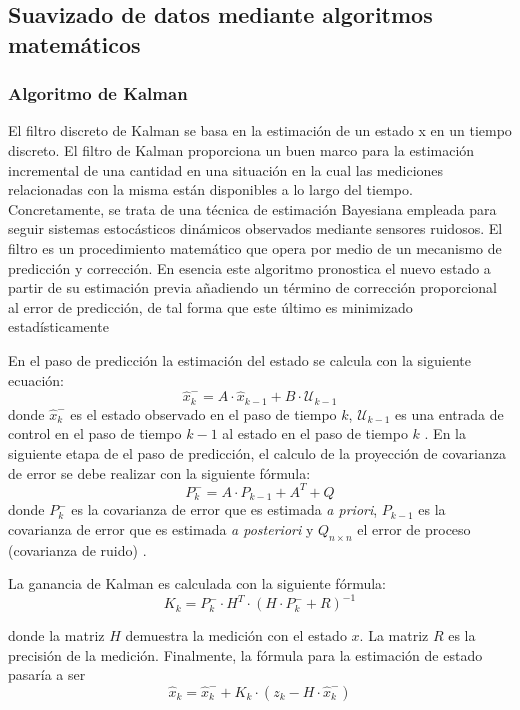 \documentclass[10pt,a4paper]{article}
\begin{document}
\subsection{Suavizado de datos mediante algoritmos matemáticos}

\subsubsection{Algoritmo de Kalman}
El filtro discreto de Kalman se basa en la estimación de un estado x en un tiempo discreto. El filtro de Kalman proporciona un buen marco para la estimación incremental de una cantidad en una situación en la cual las mediciones relacionadas con la misma están disponibles a lo largo del tiempo. Concretamente, se trata de una técnica de estimación Bayesiana empleada para seguir sistemas estocásticos dinámicos observados mediante sensores ruidosos. El filtro es un procedimiento matemático que opera por medio de un mecanismo de predicción y corrección.  En esencia este algoritmo pronostica el nuevo estado a partir de su estimación previa añadiendo un término de corrección proporcional al error de predicción, de tal forma que este último es minimizado estadísticamente

En el paso de predicción la estimación del estado se calcula con la siguiente ecuación: 
\begin{equation}
\hat{x}^{-}_{k} = A \cdot \hat{x}_{k-1} + B \cdot \mathcal{U}_{k-1}
\end{equation}
donde $\hat{x}^{-}_{k}$ es el estado observado en el paso de tiempo $k$, $\mathcal{U}_{k-1}$ es una entrada de control en el paso de tiempo $k-1$ al estado en el paso de tiempo $k$ \cite{Kowalski2018}. En la siguiente etapa de el paso de predicción, el calculo de la proyección de covarianza de error se debe realizar con la siguiente fórmula:
\begin{equation}
P^{-}_{k} = A \cdot P_{k-1} + A^T + Q
\end{equation}
donde $P^{-}_{k}$ es la covarianza de error que es estimada \textit{a priori}, $P_{k-1}$ es la covarianza de error que es estimada \textit{a posteriori} y $Q_{n \times n}$ el error de proceso (covarianza de ruido) \cite{Kowalski2018}.

La ganancia de Kalman es calculada con la siguiente fórmula:
\begin{equation}
K_{k} = P^{-}_{k} \cdot H^T \cdot (H\cdot P^-_{k}+R)^{-1}
\end{equation}

donde la matriz $H$ demuestra la medición con el estado $x$. La matriz $R$ es la precisión de la medición. Finalmente, la fórmula para la estimación de estado pasaría a ser
\begin{equation}
\hat{x}_{k} = \hat{x}^{-}_{k} + K_{k} \cdot (z_k - H \cdot \hat{x}^{-}_{k})
\end{equation}
\end{document}
